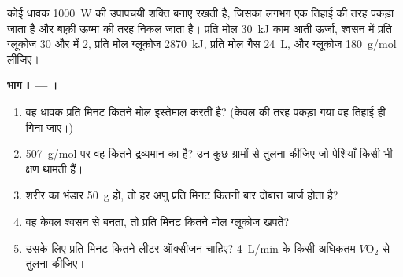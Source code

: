 \begin{problem}
\label{pb:g12:respiration-fermentation:1}
कोई धावक \qty{1000}{W} की उपापचयी शक्ति बनाए रखती है, जिसका लगभग एक तिहाई
 की तरह पकड़ा जाता है और बाक़ी ऊष्मा की तरह निकल जाता है। प्रति मोल 
\qty{30}{kJ} काम आती ऊर्जा, श्वसन में प्रति ग्लूकोज 30  और  में 2,
प्रति मोल ग्लूकोज \qty{2870}{kJ}, प्रति मोल गैस \qty{24}{L}, और ग्लूकोज
\qty{180}{g/mol} लीजिए।

\medskip
\noindent\textbf{भाग I --- ।}
\begin{enumerate}
  \item वह धावक प्रति मिनट कितने मोल  इस्तेमाल करती है?
        (केवल  की तरह पकड़ा गया वह तिहाई ही गिना जाए।)
  \item \qty{507}{g/mol} पर वह कितने द्रव्यमान का  है? उन कुछ ग्रामों से
        तुलना कीजिए जो पेशियाँ किसी भी क्षण थामती हैं।
  \item शरीर का भंडार \qty{50}{g} हो, तो हर  अणु प्रति मिनट कितनी बार
        दोबारा चार्ज होता है?
  \item वह  केवल श्वसन से बनता, तो प्रति मिनट कितने मोल ग्लूकोज खपते?
  \item उसके लिए प्रति मिनट कितने लीटर ऑक्सीजन चाहिए? \qty{4}{L/min} के
        किसी अधिकतम $\dot V\!\mathrm{O_2}$ से तुलना कीजिए।
\end{enumerate}


\end{problem}
